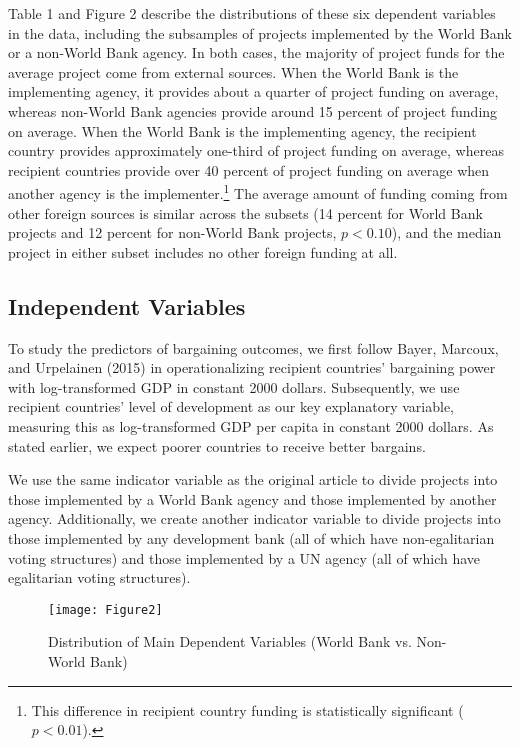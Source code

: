 \documentclass{article}
\begin{document}
Table 1 and Figure 2 describe the distributions of these six dependent variables in the data, including the subsamples of projects implemented by the World Bank or a non-World Bank agency.  In both cases, the majority of project funds for the average project come from external sources.  When the World Bank is the implementing agency, it provides about a quarter of project funding on average, whereas non-World Bank agencies provide around 15 percent of project funding on average.  When the World Bank is the implementing agency, the recipient country provides approximately one-third of project funding on average, whereas recipient countries provide over 40 percent of project funding on average when another agency is the implementer.\footnote{This difference in recipient country funding is statistically significant ($p < 0.01$).}   The average amount of funding coming from other foreign sources is similar across the subsets (14 percent for World Bank projects and 12 percent for non-World Bank projects, $p < 0.10$), and the median project in either subset includes no other foreign funding at all.  

\subsection{Independent Variables}
To study the predictors of bargaining outcomes, we first follow Bayer, Marcoux, and Urpelainen (2015) in operationalizing recipient countries’ bargaining power with log-transformed GDP in constant 2000 dollars.  Subsequently, we use recipient countries’ level of development as our key explanatory variable, measuring this as log-transformed GDP per capita in constant 2000 dollars.  As stated earlier, we expect poorer countries to receive better bargains. 

We use the same indicator variable as the original article to divide projects into those implemented by a World Bank agency and those implemented by another agency.  Additionally, we create another indicator variable to divide projects into those implemented by any development bank (all of which have non-egalitarian voting structures) and those implemented by a UN agency (all of which have egalitarian voting structures).  

\begin{figure}[H]
	\centering
	\caption{Distribution of Main Dependent Variables (World Bank vs. Non-World Bank)}
	\texttt{[image: Figure2]}
	\label{fig:figure2}
\end{figure}
\end{document}
